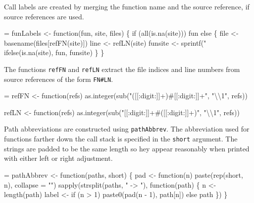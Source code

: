 \documentclass[11pt]{article}
\begin{document}
Call labels are created by merging the function name and the source
reference, if source references are used.
\begin{nwchunk}
=
 funLabels <- function(fun, site, files) \{
     if (all(is.na(site)))
         fun
     else \{
         file <- basename(files[refFN(site)])
         line <- refLN(site)
         funsite <- sprintf("%
         ifelse(is.na(site), fun, funsite)
     \}
 \}
\end{nwchunk}
The functions \Verb!refFN! and \Verb?refLN? extract the file indices and
line numbers from source references of the form \verb|FN#LN|.
\begin{nwchunk}
=
 refFN <- function(refs)
     as.integer(sub("([[:digit:]]+)#[[:digit:]]+", "{\textbackslash}{\textbackslash}1", refs))
 
 refLN <- function(refs)
     as.integer(sub("[[:digit:]]+#([[:digit:]]+)", "{\textbackslash}{\textbackslash}1", refs))
\end{nwchunk}

Path abbreviations are constructed using \Verb!pathAbbrev!. The
abbreviation used for functions farther down the call stack is
specified in the \Verb!short! argument. The strings are padded to be the
same length so hey appear reasonably when printed with either left or
right adjustment.
\begin{nwchunk}
=
 pathAbbrev <- function(paths, short) \{
     pad <- function(n) paste(rep(short, n), collapse = "")
     sapply(strsplit(paths, " -> "),
            function(path) \{
                n <- length(path)
                label <- if (n > 1) paste0(pad(n - 1), path[n]) else path
            \})
 \}
\end{nwchunk}
\end{document}
